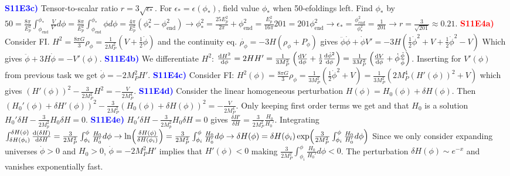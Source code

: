 \documentclass[landscape, a4paper,1pt,english]{article}
\begin{document}
{{{\begin{multicols}{5}
\textcolor{blue}{\textbf{S11E3c)}} Tensor-to-scalar ratio $r = 3\sqrt{\epsilon_*}$. For $\epsilon_* = \epsilon(\phi_*)$, field value $\phi_*$ when 50-efoldings left. Find $\phi_*$ by $50 = \frac{8\pi}{E_p^2}\int_{\phi_\text{end}}^{\phi_*}\frac{V}{V'}d\phi = \frac{8\pi}{E_p^2}\int_{\phi_\text{end}}^{\phi_*}\phi d\phi = \frac{4\pi}{E_p^2}(\phi_*^2 - \phi_\text{end}^2)\rightarrow\phi_*^2 = \frac{25E_p^2}{2\pi} + \phi_\text{end}^2 = \frac{E_p^2}{16\pi}201 = 201\phi_\text{end}^2\rightarrow\epsilon_* = \frac{\phi_{end}^2}{\phi_*^2} = \frac{1}{201}\rightarrow r = \frac{3}{\sqrt{201}}\approx 0.21$.
\textcolor{red}{\textbf{S11E4a)}} Consider FI. $H^2 = \frac{8\pi G}{3}\rho_\phi =  \frac{1}{2M_P^2}(V + \frac{1}{2}\dot{\phi})$ and the continuity eq. $\dot{\rho_\phi} = -3H(\rho_\phi + P_\phi)$ gives $\ddot{\phi}\dot{\phi} + \dot{\phi}V' = -3H(\frac{1}{2}\dot{\phi}^2 + V + \frac{1}{2}\dot{\phi}^2 - V)$ Which gives $\ddot{\phi} + 3H\dot{\phi} = -V'(\phi)$.
\textcolor{blue}{\textbf{S11E4b)}} We differentiate $H^2$: $\dv{H^2}{\phi} = 2H H' = \frac{1}{3M_P^2}\left(\dv{V}{\phi} + \frac{1}{2}\dv{\dot{\phi}^2}{\phi}\right)
= \frac{1}{3M_P^2}\left(\dv{V}{\phi} + \dot{\phi}\frac{\ddot{\phi}}{\dot{\phi}}\right)$. Inserting for $V'(\phi)$ from previous task we get $\dot{\phi} = -2M_P^2H'$.
\textcolor{blue}{\textbf{S11E4c)}} Consider FI: 
$H^2(\phi) = \frac{8\pi G}{3}\rho_\phi = \frac{1}{3M_P^2}\left(\frac{1}{2}\dot{\phi}^2 + V\right) =  \frac{1}{3M_P^2}\left(2M_P^4(H'(\phi))^2 + V\right)$ which gives $(H'(\phi))^2 -\frac{3}{2M_P^2}H^2 = -\frac{V}{2M_P^4}$.
\textcolor{blue}{\textbf{S11E4d)}} Consider the linear homogeneous perturbation $H(\phi) = H_0(\phi) + \delta H(\phi)$. Then 
$(H_0'(\phi) + \delta H'(\phi))^2 -\frac{3}{2M_P^2}(H_0(\phi) + \delta H(\phi))^2 = -\frac{V}{2M_P^4}$. Only keeping first order terms we get and that $H_0$ is a solution $H_0'\delta H - \frac{3}{2M_p^2}H_0\delta H = 0$.
\textcolor{blue}{\textbf{S11E4e)}} $H_0'\delta H - \frac{3}{2M_p^2}H_0\delta H = 0$ gives $\frac{\delta H'}{\delta H} = \frac{3}{2M_P^2}\frac{H_0}{H_0'}$. Integrating $\int_{\delta H(\phi_i)}^{\delta H(\phi)}\dv{(\delta H)}{\delta H} = \frac{3}{2M_P^2}\int_{\phi_i}^{\phi}\frac{H_0}{H_0'}d\phi \rightarrow \ln(\frac{\delta H(\phi)}{\delta H(\phi_i)}) = \frac{3}{2M_P^2}\int_{\phi_i}^{\phi}\frac{H_0}{H_0'}d\phi \rightarrow \delta H(\phi) = \delta H(\phi_i)\exp(\frac{3}{2M_P^2}\int_{\phi_i}^{\phi}\frac{H_0}{H_0'}d\phi)$
Since we only consider expanding universes $\dot{\phi}>0$ and $H_0>0$, $\dot{\phi} = -2M_P^2H'$ implies that $H'(\phi)<0$ making 
$\frac{3}{2M_P^2}\int_{\phi_i}^{\phi}\frac{H_0}{H_0'}d\phi<0$. The perturbation $\delta H(\phi)\sim e^{-x}$ and vanishes exponentially fast.

\end{multicols}}}}
\end{document}
